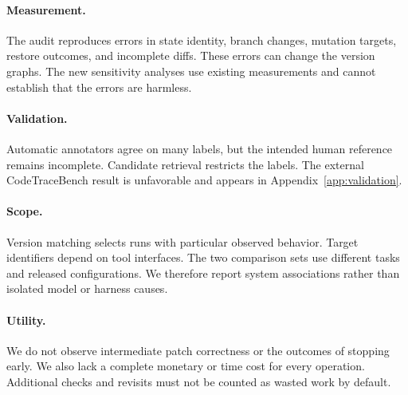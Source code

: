 \documentclass[10pt,a4paper,twocolumn]{article}
\begin{document}
\paragraph{Measurement.}
The audit reproduces errors in state identity, branch changes, mutation targets, restore outcomes, and incomplete diffs. These errors can change the version graphs. The new sensitivity analyses use existing measurements and cannot establish that the errors are harmless.
\paragraph{Validation.}
Automatic annotators agree on many labels, but the intended human reference remains incomplete. Candidate retrieval restricts the labels. The external CodeTraceBench result is unfavorable and appears in Appendix~\ref{app:validation}.
\paragraph{Scope.}
Version matching selects runs with particular observed behavior. Target identifiers depend on tool interfaces. The two comparison sets use different tasks and released configurations. We therefore report system associations rather than isolated model or harness causes.
\paragraph{Utility.}
We do not observe intermediate patch correctness or the outcomes of stopping early. We also lack a complete monetary or time cost for every operation. Additional checks and revisits must not be counted as wasted work by default.
\end{document}
